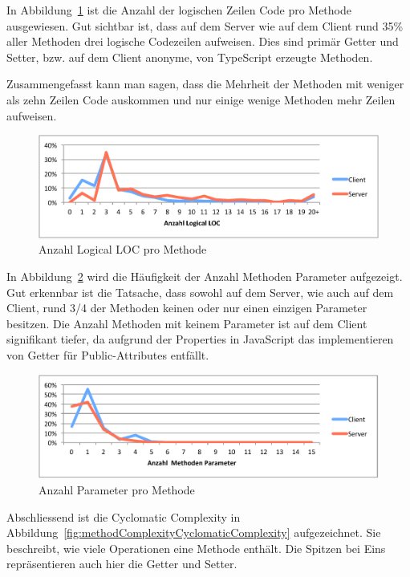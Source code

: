 	In Abbildung\ \ref{fig:methodComplexityLLOC} ist die Anzahl der logischen Zeilen Code pro Methode ausgewiesen.
	Gut sichtbar ist, dass auf dem Server wie auf dem Client rund 35\% aller Methoden drei logische Codezeilen aufweisen.
	Dies sind primär Getter und Setter, bzw. auf dem Client anonyme, von TypeScript erzeugte Methoden.
	
	Zusammengefasst kann man sagen, dass die Mehrheit der Methoden mit weniger als zehn Zeilen Code auskommen und nur einige wenige Methoden mehr Zeilen aufweisen.
	
	\begin{figure}[H]
		\includegraphics[width=\textwidth]{projectPlan/media/img/methodComplexityLLOC.pdf}
		\centering
		\caption{Anzahl Logical LOC pro Methode}
		\label{fig:methodComplexityLLOC}
	\end{figure}
	
	In Abbildung\ \ref{fig:methodComplexityParameterCount} wird die Häufigkeit der Anzahl Methoden Parameter aufgezeigt.
	Gut erkennbar ist die Tatsache, dass sowohl auf dem Server, wie auch auf dem Client,
	rund 3/4 der Methoden keinen oder nur einen einzigen Parameter besitzen.
	Die Anzahl Methoden mit keinem Parameter ist auf dem Client signifikant tiefer, da aufgrund der Properties in JavaScript das implementieren von Getter für Public-Attributes entfällt.
	
	
	\begin{figure}[H]
		\includegraphics[width=\textwidth]{projectPlan/media/img/methodComplexityParameterCount.pdf}
		\centering
		\caption{Anzahl Parameter pro Methode}
		\label{fig:methodComplexityParameterCount}
	\end{figure}
	Abschliessend ist die Cyclomatic Complexity in Abbildung\ \ref{fig:methodComplexityCyclomaticComplexity} aufgezeichnet.  
	Sie beschreibt, wie viele Operationen eine Methode enthält.
	Die Spitzen bei Eins repräsentieren auch hier die Getter und Setter.
	
